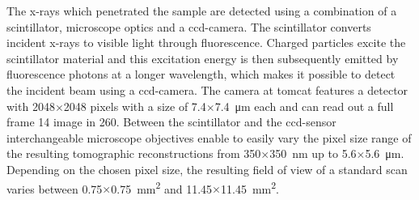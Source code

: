The x-rays which penetrated the sample are detected using a combination of a scintillator, microscope optics and a \ac{ccd}-camera. The scintillator converts incident x-rays to visible light through fluorescence. Charged particles excite the scintillator material and this excitation energy is then subsequently emitted by fluorescence photons at a longer wavelength, which makes it possible to detect the incident beam using a \ac{ccd}-camera. The camera at \ac{tomcat} features a detector with 2048$\times$2048 pixels with a size of 7.4$\times$\SI{7.4}{\micro\meter} each and can read out a full frame \SI{14}{\bit} image in \SI{260}{\millisecond}. Between the scintillator and the \ac{ccd}-sensor interchangeable microscope objectives enable to easily vary the pixel size range of the resulting tomographic reconstructions from 350$\times$\SI{350}{\nano\meter} up to 5.6$\times$\SI{5.6}{\micro\meter}. Depending on the chosen pixel size, the resulting field of view of a standard scan varies between 0.75$\times$\SI{0.75}{\milli\meter\squared} and 11.45$\times$\SI{11.45}{\milli\meter\squared}.

